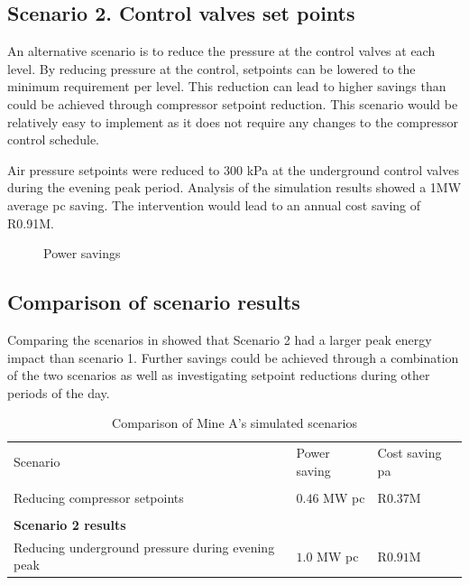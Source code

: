 \subsection{Scenario 2. Control valves set points}
An alternative scenario is to reduce the pressure at the control valves at each level. By reducing pressure at the control, setpoints can be lowered to the minimum requirement per level. This reduction can lead to higher savings than could be achieved through compressor setpoint reduction. This scenario would be relatively easy to implement as it does not require any changes to the compressor control schedule.
\par 
Air pressure setpoints were reduced to 300 kPa at the underground control valves during the evening peak period. Analysis of the simulation results showed a 1MW average \gls{pc} saving. The intervention would lead to an annual cost saving of R0.91M.
\begin{figure}[h!]
	\centering
	
	\caption{Power savings}
	\label{fig: Control Valve Results Beatrix}
\end{figure}

\subsection{Comparison of scenario results}
Comparing the scenarios in  showed that Scenario 2 had a larger peak energy impact than scenario 1. Further savings could be achieved through a combination of the two scenarios as well as investigating setpoint reductions during other periods of the day.
\begin{table}[h!]
	\centering
	\begin{tabular}{p{}
			p{}
			p{}}
		\hline 
		Scenario & Power saving & Cost saving \gls{pa} \\
		\hhline{===} 
		\multicolumn{3}{l}{\textbf{Scenario 1 results}} \\
		Reducing compressor setpoints & $ 0.46 $ MW \gls{pc} & R0.37M \\
		\\
		\multicolumn{3}{l}{\textbf{Scenario 2 results}} \\
		Reducing underground pressure during evening peak& $ 1.0 $ MW \gls{pc} & R$ 0.91 $M\\
		\hline
	\end{tabular}
	\caption{Comparison of Mine A's simulated scenarios}
	\label{Table: A Comparison}
\end{table}

